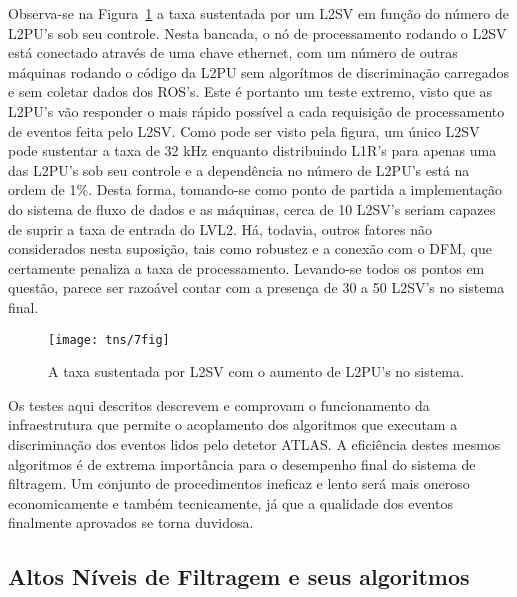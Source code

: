 Observa-se na Figura~\ref{fig:tns-7fig} a taxa sustentada por um L2SV em
função do número de L2PU's sob seu controle. Nesta bancada, o nó de
processamento rodando o L2SV está conectado através de uma chave 
ethernet, com um número de outras máquinas rodando o código da L2PU sem
algorítmos de discriminação carregados e sem coletar dados dos ROS's. Este é
portanto um teste extremo, visto que as L2PU's vão responder o mais rápido
possível a cada requisição de processamento de eventos feita pelo L2SV. Como
pode ser visto pela figura, um único L2SV pode sustentar a taxa de 32 kHz
enquanto distribuindo L1R's para apenas uma das L2PU's sob seu controle e a
dependência no número de L2PU's está na ordem de 1\%. Desta forma, tomando-se
como ponto de partida a implementação do sistema de fluxo de dados e as
máquinas, cerca de 10 L2SV's seriam capazes de suprir a taxa de entrada do
LVL2. Há, todavia, outros fatores não considerados nesta suposição, tais como
robustez e a conexão com o DFM, que certamente penaliza a taxa de
processamento. Levando-se todos os pontos em questão, parece ser razoável
contar com a presença de 30 a 50 L2SV's no sistema final.

\begin{figure}
\begin{center}
\texttt{[image: tns/7fig]}
\end{center}
\caption{A taxa sustentada por L2SV com o aumento de L2PU's no sistema.}
\label{fig:tns-7fig}
\end{figure}

Os testes aqui descritos descrevem e comprovam o funcionamento da
infraestrutura que permite o acoplamento dos algoritmos que executam a
discriminação dos eventos lidos pelo detetor ATLAS. A eficiência destes mesmos
algoritmos é de extrema importância para o desempenho final do sistema de
filtragem. Um conjunto de procedimentos ineficaz e lento será mais oneroso
economicamente e também tecnicamente, já que a qualidade dos eventos
finalmente aprovados se torna duvidosa.

\subsection{Altos Níveis de Filtragem e seus algoritmos}
\label{sec:hlt}

